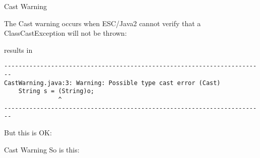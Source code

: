 \documentclass[
pdf,
nocolorBG,
slideColor,
cok,
]{prosper}
\begin{document}
\begin{slide}{Cast Warning}
\vspace*{-9ex}

The Cast warning occurs when ESC/Java2 cannot verify that a ClassCastException will not be thrown:
\begin{figure*}
\tiny

\end{figure*}
results in
{\tiny
\begin{verbatim}
------------------------------------------------------------------------
CastWarning.java:3: Warning: Possible type cast error (Cast)
    String s = (String)o;
               ^
------------------------------------------------------------------------
\end{verbatim}
}
But this is OK:
\begin{figure*}
\tiny

\end{figure*}

\end{slide}

\begin{slide}{Cast Warning}
So is this:
\begin{figure*}
\tiny

\end{figure*}

\end{slide}
\end{document}
